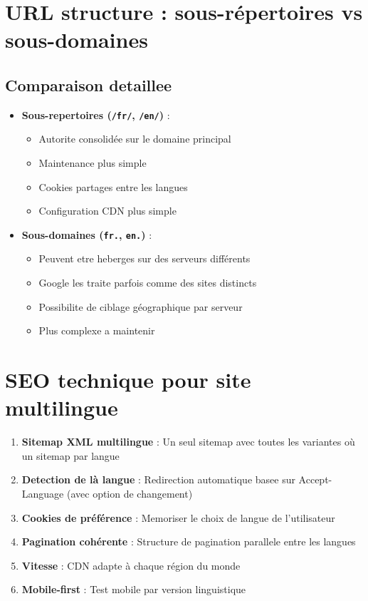 \section{URL structure : sous-répertoires vs sous-domaines}

\subsection{Comparaison detaillee}

\begin{itemize}
    \item \textbf{Sous-repertoires (\texttt{/fr/}, \texttt{/en/})} :
    \begin{itemize}
        \item Autorite consolidée sur le domaine principal
        \item Maintenance plus simple
        \item Cookies partages entre les langues
        \item Configuration CDN plus simple
    \end{itemize}
    \item \textbf{Sous-domaines (\texttt{fr.}, \texttt{en.})} :
    \begin{itemize}
        \item Peuvent etre heberges sur des serveurs différents
        \item Google les traite parfois comme des sites distincts
        \item Possibilite de ciblage géographique par serveur
        \item Plus complexe a maintenir
    \end{itemize}
\end{itemize}

\section{SEO technique pour site multilingue}

\begin{enumerate}
    \item \textbf{Sitemap XML multilingue} : Un seul sitemap avec toutes les variantes où un sitemap par langue
    \item \textbf{Detection de là langue} : Redirection automatique basee sur Accept-Language (avec option de changement)
    \item \textbf{Cookies de préférence} : Memoriser le choix de langue de l'utilisateur
    \item \textbf{Pagination cohérente} : Structure de pagination parallele entre les langues
    \item \textbf{Vitesse} : CDN adapte à chaque région du monde
    \item \textbf{Mobile-first} : Test mobile par version linguistique
\end{enumerate}


